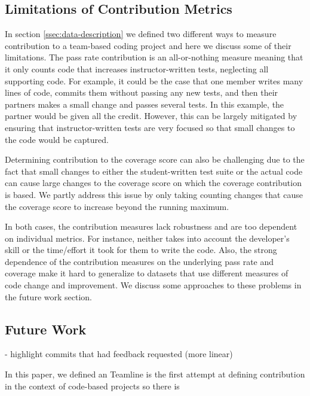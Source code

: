 \documentclass[../manifest.tex]{subfiles}
\begin{document}
\subsection{Limitations of Contribution Metrics}
In section \ref{ssec:data-description} we defined two different ways to measure contribution to a team-based coding project and here we discuss some of their limitations.
The pass rate contribution is an all-or-nothing measure meaning that it only counts code that increases instructor-written tests, neglecting all supporting code. For example, it could be the case that one member writes many lines of code, commits them without passing any new tests, and then their partners makes a small change and passes several tests. In this example, the partner would be given all the credit. However, this can be largely mitigated by ensuring that instructor-written tests are very focused so that small changes to the code would be captured.

Determining contribution to the coverage score can also be challenging due to the fact that small changes to either the student-written test suite or the actual code can cause large changes to the coverage score on which the coverage contribution is based. We partly address this issue by only taking counting changes that cause the coverage score to increase beyond the running maximum.

In both cases, the contribution measures lack robustness and are too dependent on individual metrics. For instance, neither takes into account the developer's skill or the time/effort it took for them to write the code. Also, the strong dependence of the contribution measures on the underlying pass rate and coverage make it hard to generalize to datasets that use different measures of code change and improvement. We discuss some approaches to these problems in the future work section.


\subsection{Future Work}
- highlight commits that had feedback requested (more linear)






In this paper, we defined an
Teamline is the first attempt at defining contribution in the context of code-based projects so there is
\end{document}
